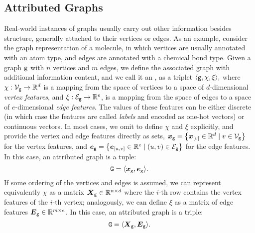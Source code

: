 \subsection{Attributed Graphs} \label{sec:attr-graphs}
Real-world instances of graphs usually carry out other information besides structure, generally attached to their vertices or edges. As an example, consider the graph representation of a molecule, in which vertices are usually annotated with an atom type, and edges are annotated with a chemical bond type. Given a graph $\mathtt{g}$ with $n$ vertices and $m$ edges, we define the associated graph with additional information content, and we call it an , as a triplet $\langle \mathtt{g}, \chi, \xi \rangle,$ where $\chi: \Nodes{g} \rightarrow \Real^d$ is a mapping from the space of vertices to a space of $d$-dimensional \emph{vertex features}, and $\xi: \Edges{g}\rightarrow \Real^{e}$, is a mapping from the space of edges to a space of $e$-dimensional \emph{edge features}. The values of these features can be either discrete (in which case the features are called \emph{labels} and encoded as one-hot vectors) or continuous vectors. In most cases, we omit to define $\chi$ and $\xi$ explicitly, and provide the vertex and edge features directly as sets, \eg $\Vector{x}_{\Graph{g}}= \Set{\Elem{x}{v} \in \Real^d \mid v \in \Nodes{g}}$ for the vertex features, and $\Vector{e}_{\Graph{g}} = \Set{\Elem{e}{u,v} \in \Real^e \mid (u, v) \in \Edges{g}}$ for the edge features. In this case, an attributed graph is a tuple:
$$\GraphU{g} = \VectorGraph{x}{g}.$$
If some ordering of the vertices and edges is assumed, we can represent equivalently $\chi$ as a matrix $\Matrix{X}_{\Graph{g}} \in \Real^{n \times d}$ where the $i$-th row contains the vertex features of the $i$-th vertex; analogously, we can define $\xi$ as a matrix of edge features $\Matrix{E}_{\Graph{g}} \in \Real^{m \times e}$. In this case, an attributed graph is a triple:
$$\GraphU{g} = \MatrixGraph{x}{g}.$$

